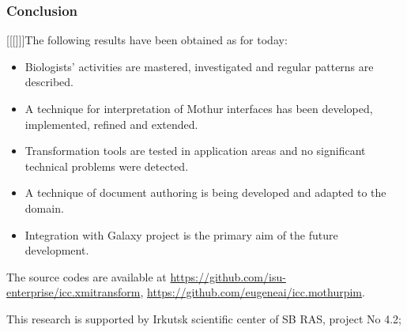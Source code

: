 \documentclass[10pt]{beamer}
\begin{document}
\begin{frame}
  \frametitle{Conclusion}
  [[[]]]The following results have been obtained as for today:
  \begin{itemize}
  \item Biologists' activities are mastered, investigated and regular patterns are described.
  \item A technique for interpretation of Mothur interfaces has been developed, implemented, refined and extended.
  \item Transformation tools are tested in application areas and no significant technical problems were detected.
  \item A technique of document authoring is being developed and adapted to the domain.
  \item Integration with Galaxy project is the primary aim of the future development.
  \end{itemize}
  The source codes are available at \url{https://github.com/isu-enterprise/icc.xmitransform}, \url{https://github.com/eugeneai/icc.mothurpim}.

  This research is supported by Irkutsk scientific center of SB RAS, project No 4.2;
\end{frame}
\end{document}
